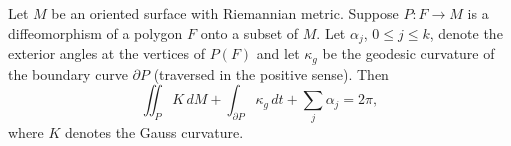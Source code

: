 Let $M$ be an oriented surface with Riemannian metric. Suppose $P: F \to M$ is a diffeomorphism of a polygon $F$ onto a subset of $M$. Let $\alpha_j$, $0 \leq j \leq k$, denote the exterior angles at the vertices of $P(F)$ and let $\kappa_g$ be the geodesic curvature of the boundary curve $\partial P$ (traversed in the positive sense). Then
$$\iint_P K \, dM + \int_{\partial P} \kappa_g \, dt + \sum_j \alpha_j = 2\pi,$$
where $K$ denotes the Gauss curvature.
